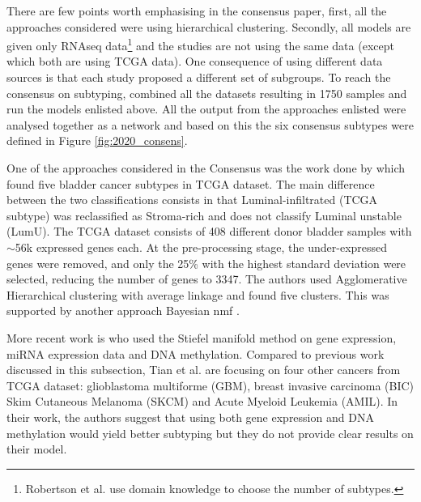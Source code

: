 There are few points worth emphasising in the consensus paper, first, all the approaches\cite{Mo2018-rl, Damrauer2014-tc, Choi2014-ed, Marzouka2018-ge, Rebouissou2014-ep,Robertson2017-mg} considered were using hierarchical clustering. Secondly, all models are given only RNAseq data\footnote{Robertson et al. use domain knowledge to choose the number of subtypes.} and the studies are not using the same data (except \cite{Robertson2017-mg, Mo2018-rl} which both are using TCGA data). One consequence of using different data sources is that each study proposed a different set of subgroups. To reach the consensus on subtyping, \citet{Kamoun2020-tj} combined all the datasets resulting in 1750 samples and run the models enlisted above. All the output from the approaches enlisted were analysed together as a network and based on this the six consensus subtypes were defined in Figure \ref{fig:2020_consens}.



One of the approaches considered in the Consensus was the work done by \citet{Robertson2017-mg} which found five bladder cancer subtypes in TCGA dataset. The main difference between the two classifications consists in that Luminal-infiltrated (TCGA subtype) was reclassified as Stroma-rich and \citet{Robertson2017-mg} does not classify Luminal unstable (LumU). The TCGA dataset consists of 408 different donor bladder samples with  $\sim$56k expressed genes each. At the pre-processing stage, the under-expressed genes were removed, and only the 25\% with the highest standard deviation were selected, reducing the number of genes to 3347. The authors used Agglomerative Hierarchical clustering with average linkage and found five clusters. This was supported by another approach Bayesian \acrfull{nmf} \cite{Schmidt2009-zh}.

 
More recent work is \citet{Tian2021-vu} who used the Stiefel manifold method on gene expression, miRNA expression data and DNA methylation. Compared to previous work discussed in this subsection, Tian et al. are focusing on four other cancers from TCGA dataset: glioblastoma multiforme (GBM), breast invasive carcinoma (BIC) Skim Cutaneous Melanoma (SKCM) and Acute Myeloid Leukemia (AMIL). In their work, the authors suggest that using both gene expression and DNA methylation would yield better subtyping but they do not provide clear results on their model.

